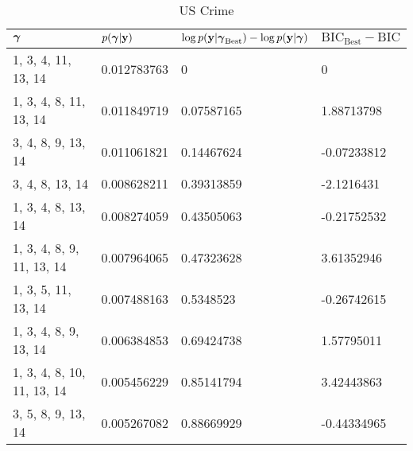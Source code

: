 \documentclass{amsart}
\begin{document}
\begin{table}
\label{tab:numerical_results5}
\caption{US Crime}
\begin{tabular}{|l|lll|}
\hline
${\boldsymbol \gamma}$ & $p({\boldsymbol \gamma}|{\bf y})$ & $\log p({\bf y} | {\boldsymbol \gamma}_\text{Best}) - \log p({\bf y} | {\boldsymbol \gamma})$ & $\text{BIC}_\text{Best} - \text{BIC}$ \\
\hline
1, 3, 4, 11, 13, 14 & 0.012783763 & 0 & 0 \\
1, 3, 4, 8, 11, 13, 14 & 0.011849719 & 0.07587165 & 1.88713798 \\
3, 4, 8, 9, 13, 14 & 0.011061821 & 0.14467624 & -0.07233812 \\
3, 4, 8, 13, 14 & 0.008628211 & 0.39313859 & -2.1216431 \\
1, 3, 4, 8, 13, 14 & 0.008274059 & 0.43505063 & -0.21752532 \\
1, 3, 4, 8, 9, 11, 13, 14 & 0.007964065 & 0.47323628 & 3.61352946 \\
1, 3, 5, 11, 13, 14 & 0.007488163 & 0.5348523 & -0.26742615 \\
1, 3, 4, 8, 9, 13, 14 & 0.006384853 & 0.69424738 & 1.57795011 \\
1, 3, 4, 8, 10, 11, 13, 14 & 0.005456229 & 0.85141794 & 3.42443863 \\
3, 5, 8, 9, 13, 14 & 0.005267082 & 0.88669929 & -0.44334965 \\
\hline
\end{tabular}
\end{table}
\end{document}
